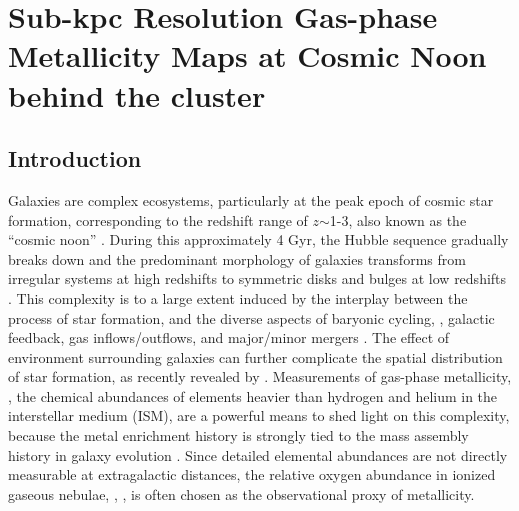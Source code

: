 
\chapter{Sub-kpc Resolution Gas-phase Metallicity Maps at Cosmic Noon behind the \protect\hff cluster \clyi}

\section{Introduction}\label{sect:intro}

Galaxies are complex ecosystems, particularly at the peak epoch of cosmic star formation,
corresponding to the redshift range of $z$$\sim$1-3, also known as the ``cosmic noon''
\citep[see][for a recent review]{2014ARA&A..52..415M}.  During this approximately 4 Gyr, the
Hubble sequence gradually breaks down and the predominant morphology of galaxies transforms
from irregular systems at high redshifts to symmetric disks and bulges at low redshifts
\citep{Mortlock:2013dg}.  This complexity is to a large extent induced by the interplay
between the process of star formation, and the diverse aspects of baryonic cycling, \eg,
galactic feedback, gas inflows/outflows, and major/minor mergers
\citep{2011MNRAS.415...11D,Martin:2012dx}.  The effect of environment surrounding galaxies
can further complicate the spatial distribution of star formation, as recently revealed by
\citet{2015ApJ...814..161V,TheGrismlensampli:-R7Qg0z6}.
Measurements of gas-phase metallicity, \ie, the chemical abundances of elements heavier than
hydrogen and helium in the interstellar medium (ISM), are a powerful means to shed light on
this complexity,
because the metal enrichment history is strongly tied to the mass assembly history in galaxy evolution
\citep{2011MNRAS.416.1354D,Lu:2015ic}.  Since detailed elemental abundances are not directly measurable at extragalactic
distances, the relative oxygen abundance in ionized gaseous nebulae, \ie, \oh, is often chosen as the observational proxy of
metallicity.

